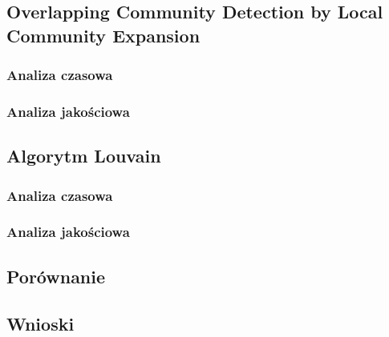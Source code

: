 \documentclass{article}
\begin{document}
\subsection{Overlapping Community Detection by Local Community Expansion}
\subsubsection{Analiza czasowa}
\subsubsection{Analiza jakościowa}

\subsection{Algorytm Louvain}
\subsubsection{Analiza czasowa}
\subsubsection{Analiza jakościowa}

\subsection{Porównanie}

\subsection{Wnioski}

\newpage
\printbibliography
\end{document}
